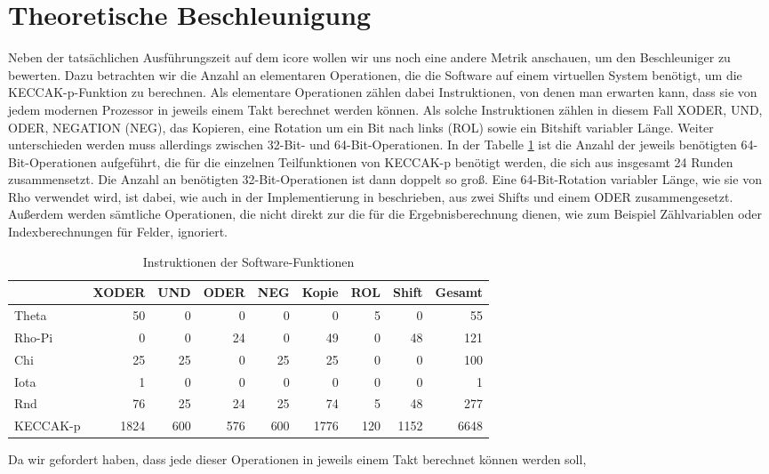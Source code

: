 \section{Theoretische Beschleunigung}
Neben der tatsächlichen Ausführungszeit auf dem icore wollen wir uns noch eine andere Metrik anschauen, um den Beschleuniger zu bewerten.
Dazu betrachten wir die Anzahl an elementaren Operationen, die die Software auf einem virtuellen System benötigt, um die KECCAK-p-Funktion zu berechnen.
Als elementare Operationen zählen dabei Instruktionen, von denen man erwarten kann, dass sie von jedem modernen Prozessor in jeweils einem Takt berechnet werden können.
Als solche Instruktionen zählen in diesem Fall XODER, UND, ODER, NEGATION (NEG), das Kopieren, eine Rotation um ein Bit nach links (ROL) sowie ein Bitshift variabler Länge.
Weiter unterschieden werden muss allerdings zwischen 32-Bit- und 64-Bit-Operationen. In der Tabelle \ref{tab:software_instruktionen} ist
die Anzahl der jeweils benötigten 64-Bit-Operationen aufgeführt, die für die einzelnen Teilfunktionen von KECCAK-p benötigt werden, die sich aus insgesamt 24 Runden zusammensetzt.
Die Anzahl an benötigten 32-Bit-Operationen ist dann doppelt so groß. Eine 64-Bit-Rotation variabler Länge, wie sie von Rho verwendet wird,
ist dabei, wie auch in der Implementierung in  beschrieben, aus zwei Shifts und einem ODER zusammengesetzt.
Außerdem werden sämtliche Operationen, die nicht direkt zur die für die Ergebnisberechnung dienen,
wie zum Beispiel Zählvariablen oder Indexberechnungen für Felder, ignoriert.
\begin{table}
    \centering
    \begin{tabular}{lrrrrrrrr}
        & XODER & UND & ODER & NEG & Kopie & ROL & Shift & Gesamt \\
        \hline
        Theta & 50 & 0 & 0 & 0 & 0 & 5 & 0 & 55 \\
        Rho-Pi & 0 & 0 & 24 & 0 & 49 & 0 & 48 & 121 \\
        Chi & 25 & 25 & 0 & 25 & 25 & 0 & 0 & 100 \\
        Iota & 1 & 0 & 0 & 0 & 0 & 0 & 0 & 1 \\
        Rnd & 76 & 25 & 24 & 25 & 74 & 5 & 48 & 277\\
        KECCAK-p & 1824 & 600 & 576 & 600 & 1776 & 120 & 1152 & 6648
    \end{tabular}
    \label{tab:software_instruktionen}
    \caption{Instruktionen der Software-Funktionen}
\end{table}
Da wir gefordert haben, dass jede dieser Operationen in jeweils einem Takt berechnet können werden soll,
